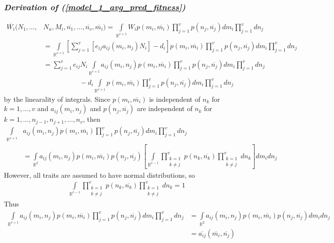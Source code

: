 \documentclass{amsart}
\theoremstyle{definition}
\theoremstyle{remark}
\numberwithin{equation}{section}
\begin{document}
\subsubsection*{\textbf{\textit{Derivation of (\ref{model_1_avg_pred_fitness})}}}
\begin{align*}
	\overline{W_i}(N_1, \dots, &N_u, M_i, \overline{n_1}, \dots, \overline{n_v}, \overline{m_i}) = \int\limits_{\mathbb{R}^{v+1}}^{}W_ip(m_i, \overline{m_i})\prod\limits_{j = 1}^{v}p(n_j, \overline{n_j})dm_i\prod\limits_{j = 1}^{v}dn_j \\
	&= \int\limits_{\mathbb{R}^{v+1}}^{}\left[\sum\limits_{j = 1}^{v}\left[e_{ij}a_{ij}(m_i, n_j)N_i\right] - d_i\right]p(m_i, \overline{m_i})\prod\limits_{j = 1}^{v}p(n_j, \overline{n_j})dm_i\prod\limits_{j = 1}^{v}dn_j \\
	&= \sum_{j=1}^{v}e_{ij}N_i\int\limits_{\mathbb{R}^{v+1}}^{}a_{ij}(m_i, n_j)p(m_i, \overline{m_i})\prod\limits_{j = 1}^{v}p(n_j, \overline{n_j})dm_i\prod\limits_{j = 1}^{v}dn_j \\
	&\ \ \ \ \ \ \ \ \ \ \ \ \ \ \ \ \ \ \ \ \ \ \ \ - d_i\int\limits_{\mathbb{R}^{v+1}}p(m_i, \overline{m_i})\prod\limits_{j = 1}^{v}p(n_j, \overline{n_j})dm_i\prod\limits_{j = 1}^{v}dn_j
\end{align*}
by the linearality of integrals.  Since $p(m_i, \overline{m_i})$ is independent of $n_k$ for $k = 1, \dots, v$ and $a_{ij}(m_i, n_j)$ and $p(n_j, \overline{n_j})$ are independent of $n_k$ for $k = 1, \dots, n_{j-1}, n_{j+1}, \dots, n_v$, then
\begin{align*}
	\int\limits_{\mathbb{R}^{v+1}}^{}&a_{ij}(m_i, n_j)p(m_i, \overline{m_i})\prod\limits_{j = 1}^{v}p(n_j, \overline{n_j})dm_i\prod\limits_{j = 1}^{v}dn_j \\
	&= \int\limits_{\mathbb{R}^2}a_{ij}(m_i, n_j)p(m_i, \overline{m_i})p(n_j, \overline{n_j})\left[\int\limits_{\mathbb{R}^{v-1}}\prod\limits_{\substack{k=1\\k\neq j}}^{v}p(n_k, \overline{n_k})\prod\limits_{\substack{k=1\\k\neq j}}^{v}dn_k\right]dm_idn_j
\end{align*}
However, all traits are assumed to have normal distributions, so
\begin{align*}
	\int\limits_{\mathbb{R}^{v-1}}\prod\limits_{\substack{k=1\\k\neq j}}^{v}p(n_k, \overline{n_k})\prod\limits_{\substack{k=1\\k\neq j}}^{v}dn_k = 1
\end{align*}
Thus
\begin{align*}
	\int\limits_{\mathbb{R}^{v+1}}^{}a_{ij}(m_i, n_j)p(m_i, \overline{m_i})\prod\limits_{j = 1}^{v}p(n_j, \overline{n_j})dm_i\prod\limits_{j = 1}^{v}dn_j &= \int\limits_{\mathbb{R}^2}a_{ij}(m_i, n_j)p(m_i, \overline{m_i})p(n_j, \overline{n_j})dm_idn_j \\
	&= \overline{a_{ij}}(\overline{m_i}, \overline{n_j})
\end{align*}
\end{document}
